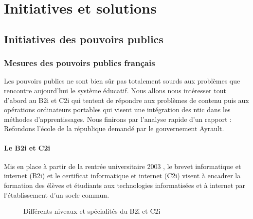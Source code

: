 
\part{Initiatives et solutions}\label{initiatives_actuelles}

\chapter{Initiatives des pouvoirs publics}
\label{chap:initialivespublic}

\section{Mesures des pouvoirs publics français}

Les pouvoirs publics ne sont bien sûr pas totalement sourds aux
problèmes que rencontre aujourd'hui le système éducatif. Nous allons
nous intéresser tout d'abord au \og{}B2i et C2i\fg{} qui tentent de répondre aux
problèmes de contenu puis aux opérations \og{}ordinateurs
portables\fg{} qui visent une intégration des \gls{ntic} dans les méthodes
d'apprentissages. Nous finirons par l'analyse rapide d'un
rapport : \og{}Refondons l'école de la république\fg{}
demandé par le gouvernement Ayrault.

\subsection{Le B2i et C2i}
Mis en place à partir de la rentrée universitaire 2003
\cite{circulaire_c2i}, le brevet informatique et internet (B2i) et le
certificat informatique et internet (C2i) 
visent à encadrer la formation des élèves et étudiants aux technologies
informatisées et à internet par l'établissement d'un socle commun.

\begin{figure}[H]
	\begin{center}
	\caption{Différents niveaux et spécialités du B2i et C2i}
	\end{center}
\end{figure}



